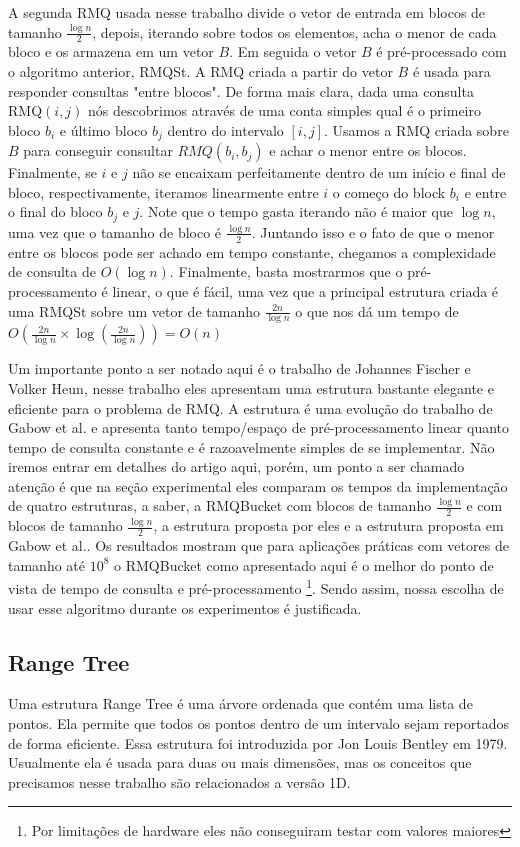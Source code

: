 \documentclass[dissertacao, brazil]{ThesisPUC}
\begin{document}
A segunda RMQ usada nesse trabalho divide o vetor de entrada em blocos de tamanho $\frac{\log n}{2}$,
depois, iterando sobre todos os elementos, acha o menor de cada bloco e os armazena em um vetor $B$.
Em seguida o vetor $B$ é pré-processado com o algoritmo anterior, RMQSt. A RMQ criada a partir do 
vetor $B$ é usada para responder consultas "entre blocos". De forma mais clara, dada uma consulta
RMQ$(i, j)$ nós descobrimos através de uma conta simples qual é o primeiro bloco $b_i$ e último 
bloco $b_j$ dentro do intervalo $[i, j]$. Usamos a RMQ criada sobre $B$ para conseguir consultar
$RMQ(b_i, b_j)$ e achar o menor entre os blocos. Finalmente, se $i$ e $j$ não se encaixam perfeitamente
dentro de um início e final de bloco, respectivamente, iteramos linearmente entre $i$ o começo do block $b_i$ 
e entre o final do bloco $b_j$ e $j$. Note que o tempo gasta iterando não é maior que $\log n$, uma vez
que o tamanho de bloco é $\frac{\log n}{2}$. Juntando isso e o fato de que o menor entre os blocos pode
ser achado em tempo constante, chegamos a complexidade de consulta de $O(\log n)$. Finalmente,
basta mostrarmos que o pré-processamento é linear, o que é fácil, uma vez que a principal estrutura
criada é uma RMQSt sobre um vetor de tamanho $\frac{2n}{\log n}$ o que nos dá um tempo de $O(\frac{2n}{\log n} \times \log(\frac{2n}{\log n}))  = O(n)$
    
Um importante ponto a ser notado aqui é o trabalho de Johannes Fischer e Volker Heun\cite{},
nesse trabalho eles apresentam uma estrutura bastante elegante e eficiente para o problema
de RMQ. A estrutura é uma evolução do trabalho de Gabow et al.\cite{} e apresenta tanto tempo/espaço
de pré-processamento linear quanto tempo de consulta constante e é razoavelmente simples de se
implementar. Não iremos entrar em detalhes do artigo aqui, porém, um ponto a ser chamado atenção é que na seção
experimental eles comparam os tempos da implementação de quatro estruturas, a saber, a RMQBucket com blocos
de tamanho $\frac{\log n}{2}$ e com blocos de tamanho $\frac{\log n}{2}$, a estrutura proposta por eles e 
a estrutura proposta em Gabow et al.. Os resultados mostram que para aplicações práticas com vetores
de tamanho até $10^8$ o RMQBucket como apresentado aqui é o melhor do ponto de vista de tempo de consulta e pré-processamento
\footnote{Por limitações de hardware eles não conseguiram testar com valores maiores}. 
Sendo assim, nossa escolha de usar esse algoritmo durante os experimentos é justificada. 

\subsection{Range Tree}
\label{rangeTree}
Uma estrutura Range Tree é uma árvore ordenada que contém uma lista 
de pontos. Ela permite que todos os pontos dentro de um intervalo sejam
reportados de forma eficiente. Essa estrutura foi introduzida por Jon Louis 
Bentley em 1979\cite{lala}. Usualmente ela é usada para duas ou
mais dimensões, mas os conceitos que precisamos nesse trabalho são relacionados
a versão 1D.
\end{document}
